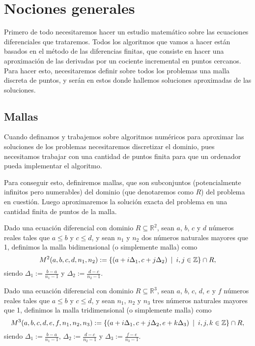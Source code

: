 \section{Nociones generales}
Primero de todo necesitaremos hacer un estudio matemático sobre las ecuaciones diferenciales que trataremos. Todos los algoritmos que vamos a hacer están basados en el método de las diferencias finitas, que consiste en hacer una aproximación de las derivadas por un cociente incremental en puntos cercanos. Para hacer esto, necesitaremos definir sobre todos los problemas una malla discreta de puntos, y serán en estos donde hallemos soluciones aproximadas de las soluciones.

\subsection{Mallas}\label{sec:malla}
Cuando definamos y trabajemos sobre algoritmos numéricos para aproximar las soluciones de los problemas necesitaremos discretizar el dominio, pues necesitamos trabajar con una cantidad de puntos finita para que un ordenador pueda implementar el algoritmo.

Para conseguir esto, definiremos mallas, que son subconjuntos (potencialmente infinitos pero numerables) del dominio (que denotaremos como $R$) del problema en cuestión. Luego aproximaremos la solución exacta del problema en una cantidad finita de puntos de la malla.

\begin{definicion}\label{def:malla2d}
	Dado una ecuación diferencial con dominio $R\subseteq\mathbb{R}^2$, sean $a$, $b$, $c$ y $d$ números reales tales que $a\leq b$ y $c\leq d$, y sean $n_1$ y $n_2$ dos números naturales mayores que 1, definimos la malla bidimensional (o simplemente malla) como
	\begin{equation}
	M^2(a,b,c,d,n_1,n_2) := \{(a+i\Delta_1,c+j\Delta_2) \hspace{5px} | \hspace{5px} i,j\in\mathbb{Z}\}\cap R,
	\end{equation}
	siendo $\Delta_1:=\frac{b-a}{n_1-1}$ y $\Delta_2:=\frac{d-c}{n_2-1}$.
\end{definicion}
\begin{definicion}\label{def:malla3d}
	Dado una ecuación diferencial con dominio $R\subseteq\mathbb{R}^3$, sean $a$, $b$, $c$, $d$, $e$ y $f$ números reales tales que $a\leq b$ y $c\leq d$, y sean $n_1$, $n_2$ y $n_3$ tres números naturales mayores que 1, definimos la malla tridimensional (o simplemente malla) como
	\begin{equation}
		M^3(a,b,c,d,e,f,n_1,n_2,n_3) := \{(a+i\Delta_1,c+j\Delta_2,e+k\Delta_3) \hspace{5px} | \hspace{5px} i,j,k\in\mathbb{Z}\}\cap R,
	\end{equation}
	siendo $\Delta_1:=\frac{b-a}{n_1-1}$, $\Delta_2:=\frac{d-c}{n_2-1}$ y $\Delta_3:=\frac{f-e}{n_3-1}$.
\end{definicion}

